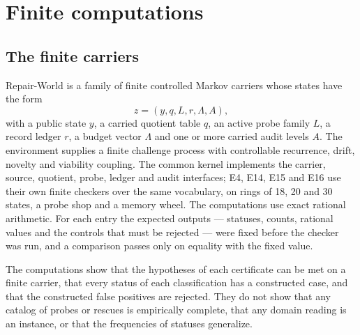 \section{Finite computations}
\label{supp:evidence}

\subsection{The finite carriers}

Repair-World is a family of finite controlled Markov carriers whose states have the form
\[
  z = (y, q, L, r, \Lambda, A),
\]
with a public state $y$, a carried quotient table $q$, an active probe family $L$, a record ledger
$r$, a budget vector $\Lambda$ and one or more carried audit levels $A$. The environment supplies a
finite challenge process with controllable recurrence, drift, novelty and viability coupling. The
common kernel implements the carrier, source, quotient, probe, ledger and audit interfaces; E4, E14,
E15 and E16 use their own finite checkers over the same vocabulary, on rings of 18, 20 and 30 states,
a probe shop and a memory wheel. The computations use exact rational arithmetic. For each entry the
expected outputs --- statuses, counts, rational values and the controls that must be rejected --- were
fixed before the checker was run, and a comparison passes only on equality with the fixed value.

The computations show that the hypotheses of each certificate can be met on a finite carrier, that
every status of each classification has a constructed case, and that the constructed false positives
are rejected. They do not show that any catalog of probes or rescues is empirically complete, that
any domain reading is an instance, or that the frequencies of statuses generalize.

